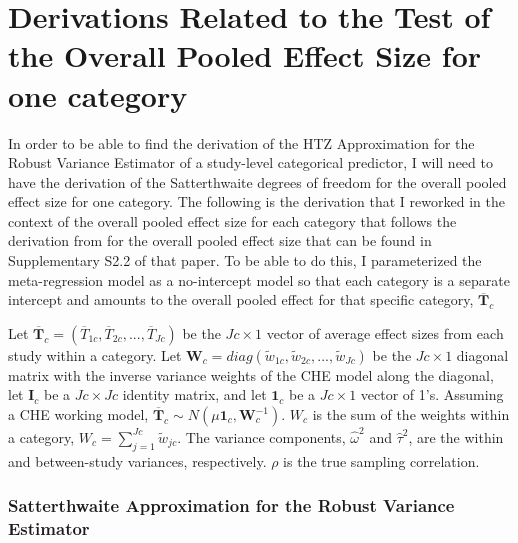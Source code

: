 

\chapter{Derivations Related to the Test of the Overall Pooled Effect Size for one category} \label{App: overallpooled}

In order to be able to find the derivation of the HTZ Approximation for the Robust Variance Estimator of a study-level categorical predictor, I will need to have the derivation of the Satterthwaite degrees of freedom for the overall pooled effect size for one category. The following is the derivation that I reworked in the context of the overall pooled effect size for each category that follows the derivation from \textcite{vembye2023} for the overall pooled effect size that can be found in Supplementary S2.2 of that paper. To be able to do this, I parameterized the meta-regression model as a no-intercept model so that each category is a separate intercept and amounts to the overall pooled effect for that specific category, $\overline{\bm{T}}_c$

Let $\overline{\bm{T}}_c = (\overline{T}_{1c}, \overline{T}_{2c}, ..., \overline{T}_{Jc})$ be the $Jc \times 1$ vector of average effect sizes from each study within a category. Let $\bm{W}_c = diag(\tilde{w}_{1c}, \tilde{w}_{2c}, ..., \tilde{w}_{Jc})$ be the $Jc \times 1$ diagonal matrix with the inverse variance weights of the CHE model along the diagonal,  let $\bm{I}_c$ be a $Jc \times Jc$ identity matrix, and let $\bm{1}_c$ be a $Jc \times 1$ vector of 1's. Assuming a CHE working model, $\overline{\bm{T}}_c \sim N(\mu \bm{1}_c, \bm{W}_c^{-1})$.   $W_c$ is the sum of the weights within a category, $W_c = \sum_{j=1}^{Jc} \tilde{w}_{jc}$. The variance components, $\hat{\omega}^2$ and $\hat{\tau}^2$, are the within and between-study variances, respectively. $\rho$ is the true sampling correlation.





\subsection{Satterthwaite Approximation for the Robust Variance Estimator}

